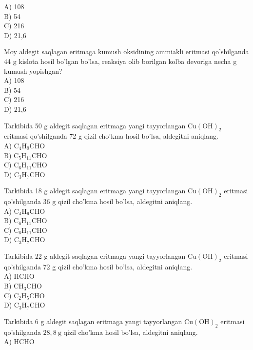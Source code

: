 A) 108\\
B) 54\\
C) 216\\
D) 21,6
  \item Moy aldegit saqlagan eritmaga kumush oksidining ammiakli eritmasi qo'shilganda 44 g kislota hosil bo'lgan bo'lsa, reaksiya olib borilgan kolba devoriga necha g kumush yopishgan?\\
A) 108\\
B) 54\\
C) 216\\
D) 21,6
  \item Tarkibida 50 g aldegit saqlagan eritmaga yangi tayyorlangan $\mathrm{Cu}(\mathrm{OH})_{2}$\\
eritmasi qo'shilganda 72 g qizil cho'kma hosil bo'lsa, aldegitni aniqlang.\\
A) $\mathrm{C}_{4} \mathrm{H}_{9} \mathrm{CHO}$\\
B) $\mathrm{C}_{5} \mathrm{H}_{11} \mathrm{CHO}$\\
C) $\mathrm{C}_{6} \mathrm{H}_{11} \mathrm{CHO}$\\
D) $\mathrm{C}_{3} \mathrm{H}_{7} \mathrm{CHO}$
  \item Tarkibida 18 g aldegit saqlagan eritmaga yangi tayyorlangan $\mathrm{Cu}(\mathrm{OH})_{2}$ eritmasi qo'shilganda 36 g qizil cho'kma hosil bo'lsa, aldegitni aniqlang.\\
A) $\mathrm{C}_{4} \mathrm{H}_{9} \mathrm{CHO}$\\
B) $\mathrm{C}_{6} \mathrm{H}_{11} \mathrm{CHO}$\\
C) $\mathrm{C}_{6} \mathrm{H}_{11} \mathrm{CHO}$\\
D) $\mathrm{C}_{3} \mathrm{H}_{7} \mathrm{CHO}$
  \item Tarkibida 22 g aldegit saqlagan eritmaga yangi tayyorlangan $\mathrm{Cu}(\mathrm{OH})_{2}$ eritmasi qo'shilganda 72 g qizil cho'kma hosil bo'lsa, aldegitni aniqlang.\\
A) HCHO\\
B) $\mathrm{CH}_{3} \mathrm{CHO}$\\
C) $\mathrm{C}_{2} \mathrm{H}_{5} \mathrm{CHO}$\\
D) $\mathrm{C}_{3} \mathrm{H}_{7} \mathrm{CHO}$
  \item Tarkibida 6 g aldegit saqlagan eritmaga yangi tayyorlangan $\mathrm{Cu}(\mathrm{OH})_{2}$ eritmasi qo'shilganda $28,8 \mathrm{~g}$ qizil cho'kma hosil bo'lsa, aldegitni aniqlang.\\
A) HCHO\\
